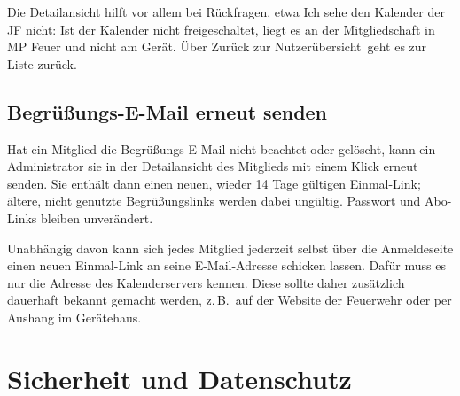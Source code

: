 \documentclass[a4paper,fontsize=10pt]{scrartcl}
\begin{document}
Die Detailansicht hilft vor allem bei Rückfragen, etwa \glqq Ich sehe den
Kalender der JF nicht\grqq: Ist der Kalender nicht freigeschaltet, liegt es an
der Mitgliedschaft in MP Feuer und nicht am Gerät. Über \glqq Zurück zur
Nutzerübersicht\grqq\ geht es zur Liste zurück.

\subsection*{Begrüßungs-E-Mail erneut senden}

Hat ein Mitglied die Begrüßungs-E-Mail nicht beachtet oder gelöscht, kann ein
Administrator sie in der Detailansicht des Mitglieds mit einem Klick erneut
senden. Sie enthält dann einen neuen, wieder 14 Tage gültigen Einmal-Link;
ältere, nicht genutzte Begrüßungslinks werden dabei ungültig. Passwort und
Abo-Links bleiben unverändert.

Unabhängig davon kann sich jedes Mitglied jederzeit selbst über die
Anmeldeseite einen neuen Einmal-Link an seine E-Mail-Adresse schicken lassen.
Dafür muss es nur die Adresse des Kalenderservers kennen. Diese sollte daher
zusätzlich dauerhaft bekannt gemacht werden, z.\,B.\ auf der Website der
Feuerwehr oder per Aushang im Gerätehaus.

\section{Sicherheit und Datenschutz}
\end{document}
